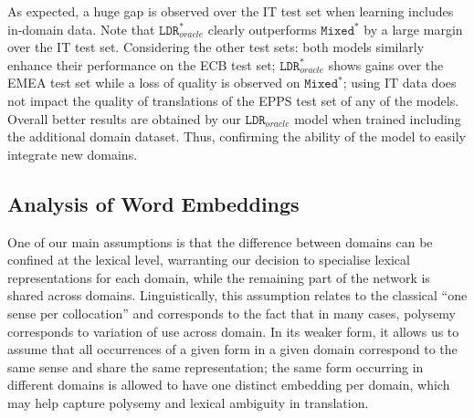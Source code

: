 \documentclass[a4paper]{article}
\begin{document}
\begin{table}[!h]
\begin{center}
\end{center}
\caption{BLEU scores for the Transformer architecture when including IT as additional domain \label{tab:add}}
\end{table}

As expected, a huge gap is observed over the IT test set when learning includes in-domain data.
Note that $\mathtt{LDR}_{oracle}^*$ clearly outperforms $\mathtt{Mixed}^*$ by a large margin over the IT test set.
%
Considering the other test sets: both models similarly enhance their performance on the ECB test set;
$\mathtt{LDR}_{oracle}^*$ shows gains over the EMEA test set while a loss of quality is observed on $\mathtt{Mixed}^*$;
using IT data does not impact the quality of translations of the EPPS test set of any of the models.
Overall better results are obtained by our $\mathtt{LDR}_{oracle}$ model when trained including the additional domain dataset.
Thus, confirming the ability of the model to easily integrate new domains. %


\subsection{Analysis of Word Embeddings \label{ssec:word_embeddings}}
One of our main assumptions is that the difference between domains can be confined at the lexical level, warranting our decision to specialise lexical representations for each domain, while the remaining part of the network is shared across domains. Linguistically, this assumption relates to the classical ``one sense per collocation'' \cite{Yarowsky93onesense} and corresponds to the fact that in many cases, polysemy corresponds to variation of use across domain. In its weaker form, it allows us to assume that all occurrences of a given form in a given domain correspond to the same sense and share the same representation; the same form occurring in different domains is allowed to have one distinct embedding per domain, which may help capture polysemy and lexical ambiguity in translation. 
\end{document}
